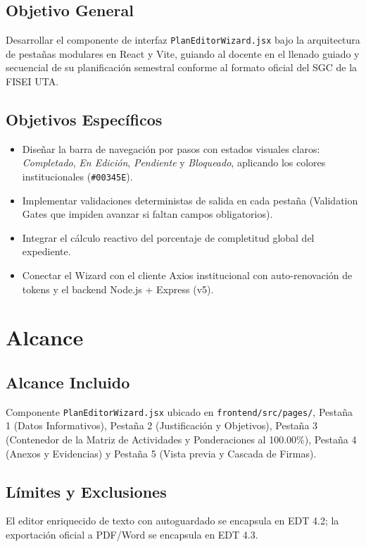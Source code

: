 \documentclass[12pt,a4paper]{article}
\begin{document}
\subsection{Objetivo General}
Desarrollar el componente de interfaz \texttt{PlanEditorWizard.jsx} bajo la arquitectura de pestañas modulares en React y Vite, guiando al docente en el llenado guiado y secuencial de su planificación semestral conforme al formato oficial del SGC de la FISEI UTA.

\subsection{Objetivos Específicos}
\begin{itemize}[leftmargin=1.5em, itemsep=1.5pt, topsep=1.5pt]
    \item Diseñar la barra de navegación por pasos con estados visuales claros: \textit{Completado}, \textit{En Edición}, \textit{Pendiente} y \textit{Bloqueado}, aplicando los colores institucionales (\texttt{\#00345E}).
    \item Implementar validaciones deterministas de salida en cada pestaña (Validation Gates que impiden avanzar si faltan campos obligatorios).
    \item Integrar el cálculo reactivo del porcentaje de completitud global del expediente.
    \item Conectar el Wizard con el cliente Axios institucional con auto-renovación de tokens y el backend Node.js + Express (v5).
\end{itemize}

\section{Alcance}

\subsection{Alcance Incluido}
Componente \texttt{PlanEditorWizard.jsx} ubicado en \texttt{frontend/src/pages/}, Pestaña 1 (Datos Informativos), Pestaña 2 (Justificación y Objetivos), Pestaña 3 (Contenedor de la Matriz de Actividades y Ponderaciones al 100.00\%), Pestaña 4 (Anexos y Evidencias) y Pestaña 5 (Vista previa y Cascada de Firmas).

\subsection{Límites y Exclusiones}
El editor enriquecido de texto con autoguardado se encapsula en EDT 4.2; la exportación oficial a PDF/Word se encapsula en EDT 4.3.
\end{document}
